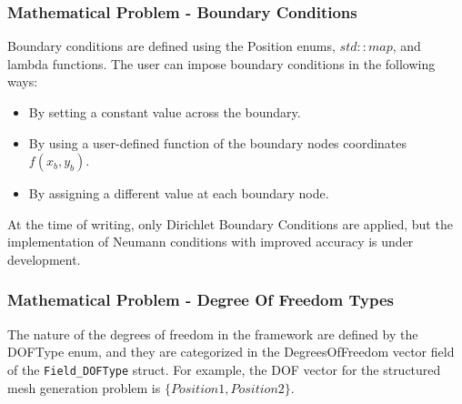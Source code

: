 \documentclass{article}
\begin{document}
	\subsubsection{Mathematical Problem - Boundary Conditions}
	Boundary conditions are defined using the Position enums, $std::map$, and lambda functions. The user can impose boundary conditions in the following ways:
	\begin{itemize}
		\item By setting a constant value across the boundary.
		\item By using a user-defined function of the boundary nodes coordinates $f(x_b, y_b)$.
		\item By assigning a different value at each boundary node.
	\end{itemize}
	At the time of writing, only Dirichlet Boundary Conditions are applied, but the implementation of Neumann conditions with improved accuracy is under development.
	
	\subsubsection{Mathematical Problem - Degree Of Freedom Types}
	The nature of the degrees of freedom in the framework are defined by the DOFType enum, and they are categorized in the DegreesOfFreedom vector field of the \texttt{Field\_DOFType} struct. For example, the DOF vector for the structured mesh generation problem is $\{Position1, Position2\}$.
	
\end{document}
